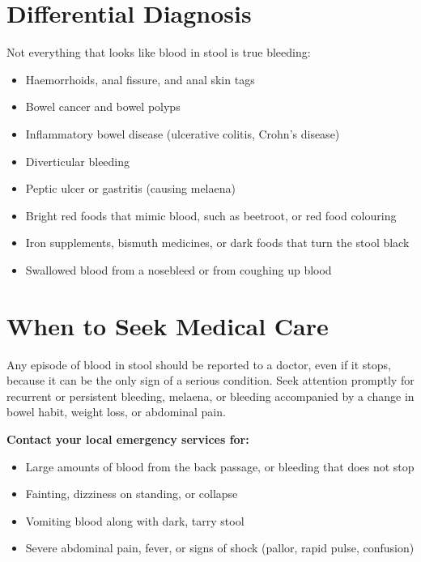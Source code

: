 \section*{Differential Diagnosis}
Not everything that looks like blood in stool is true bleeding:

\begin{itemize}
    \item Haemorrhoids, anal fissure, and anal skin tags
    \item Bowel cancer and bowel polyps
    \item Inflammatory bowel disease (ulcerative colitis, Crohn's disease)
    \item Diverticular bleeding
    \item Peptic ulcer or gastritis (causing melaena)
    \item Bright red foods that mimic blood, such as beetroot, or red food colouring
    \item Iron supplements, bismuth medicines, or dark foods that turn the stool black
    \item Swallowed blood from a nosebleed or from coughing up blood
\end{itemize}

\section*{When to Seek Medical Care}
Any episode of blood in stool should be reported to a doctor, even if it stops, because it can be the only sign of a serious condition. Seek attention promptly for recurrent or persistent bleeding, melaena, or bleeding accompanied by a change in bowel habit, weight loss, or abdominal pain.

\textbf{Contact your local emergency services for:}
\begin{itemize}
    \item Large amounts of blood from the back passage, or bleeding that does not stop
    \item Fainting, dizziness on standing, or collapse
    \item Vomiting blood along with dark, tarry stool
    \item Severe abdominal pain, fever, or signs of shock (pallor, rapid pulse, confusion)
\end{itemize}


